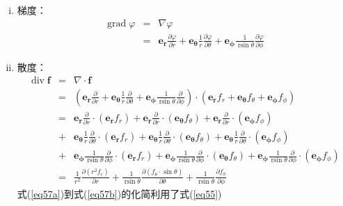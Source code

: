 \documentclass[UTF8]{ctexart}
\newcommand{\tmmathbf}[1]{\ensuremath{\boldsymbol{#1}}}
\newcommand{\tmop}[1]{\ensuremath{\operatorname{#1}}}
\newenvironment{enumerateroman}{\begin{enumerate}[i.] }{\end{enumerate}}
\begin{document}
\begin{enumerateroman}
  \item 梯度：
  \begin{eqnarray}
    \tmop{grad} \varphi & = & \nabla \varphi \nonumber\\
    & = & \tmmathbf{e_r} \frac{\partial \varphi}{\partial r} +
    \tmmathbf{e_{\theta}} \frac{1}{r} \frac{\partial \varphi}{\partial \theta}
    + \tmmathbf{e_{\phi}} \frac{1}{\tmop{rsin} \theta} \frac{\partial
    \varphi}{\partial \phi} 
  \end{eqnarray}
  \item 散度：
  \begin{subequations}
  \begin{eqnarray}
    \tmop{div} \tmmathbf{f} & = & \nabla \cdot \tmmathbf{f} \nonumber\\
    & = & \left( \tmmathbf{e_r} \frac{\partial}{\partial r} +
    \tmmathbf{e_{\theta}} \frac{1}{r} \frac{\partial}{\partial \theta} +
    \tmmathbf{e_{\phi}} \frac{1}{\tmop{rsin} \theta} \frac{\partial}{\partial
    \phi} \right) \cdot (\tmmathbf{e_r} f_r + \tmmathbf{e_{\theta}} f_{\theta}
    + \tmmathbf{e_{\phi}} f_{\phi})  \\
    & = & \tmmathbf{e_r} \frac{\partial}{\partial r} \cdot (\tmmathbf{e_r}  \label{eq57a}
    f_r) + \tmmathbf{e_r} \frac{\partial}{\partial r} \cdot
    (\tmmathbf{e_{\theta}} f_{\theta}) + \tmmathbf{e_r}
    \frac{\partial}{\partial r} \cdot (\tmmathbf{e_{\phi}} f_{\phi})
     \nonumber \\
    & + & \tmmathbf{e_{\theta}} \frac{1}{r} \frac{\partial}{\partial \theta}
    \cdot (\tmmathbf{e_r} f_r) + \tmmathbf{e_{\theta}} \frac{1}{r}
    \frac{\partial}{\partial \theta} \cdot (\tmmathbf{e_{\theta}} f_{\theta})
    + \tmmathbf{e_{\theta}} \frac{1}{r} \frac{\partial}{\partial \theta} \cdot
    (\tmmathbf{e_{\phi}} f_{\phi}) \nonumber \\
    & + & \tmmathbf{e_{\phi}} \frac{1}{\tmop{rsin} \theta}
    \frac{\partial}{\partial \phi} \cdot (\tmmathbf{e_r} f_r) +
    \tmmathbf{e_{\phi}} \frac{1}{\tmop{rsin} \theta} \frac{\partial}{\partial
    \phi} \cdot (\tmmathbf{e_{\theta}} f_{\theta}) + \tmmathbf{e_{\phi}}
    \frac{1}{\tmop{rsin} \theta} \frac{\partial}{\partial \phi} \cdot  
    (\tmmathbf{e_{\phi}} f_{\phi}) \nonumber \\
    & = & \frac{1}{r^2} \frac{\partial (r^2 f_r)}{\partial r} +
    \frac{1}{\tmop{rsin} \theta} \frac{\partial (f_{\theta} \cdot \sin
    \theta)}{\partial \theta} + \frac{1}{\tmop{rsin} \theta} \frac{\partial
    f_{\phi}}{\partial \phi}   \label{eq57b}
  \end{eqnarray}
\end{subequations}
式(\ref{eq57a})到式(\ref{eq57b})的化简利用了式(\ref{eq55})


\end{enumerateroman}
\end{document}
